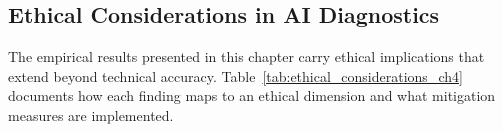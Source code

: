 
\subsection{Ethical Considerations in AI Diagnostics}

The empirical results presented in this chapter carry ethical implications that extend beyond technical accuracy. Table~\ref{tab:ethical_considerations_ch4} documents how each finding maps to an ethical dimension and what mitigation measures are implemented.

